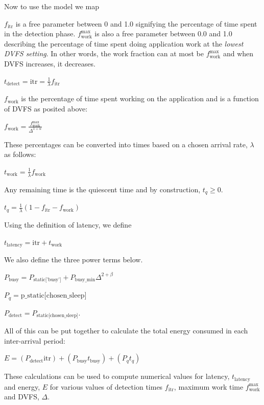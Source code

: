Now to use the model we map


$f_{\text{itr}}$ is a free parameter between 0 and 1.0 signifying the percentage of time spent in the detection phase. $f_{\text{work}}^{\text{max}}$ is also a free parameter between 0.0 and 1.0 describing the percentage of time spent doing application work at the \textit{lowest DVFS setting}. In other words, the work fraction can at most be $f_{\text{work}}^{\text{max}}$ and when DVFS increases, it decreases.

$t_{\text{detect}} = \text{itr} = \frac{1}{\lambda} f_{\text{itr}}$

$f_{\text{work}}$ is the percentage of time spent working on the application and is a function of DVFS as posited above:

$f_{\text{work}} = \frac{f_{\text{work}}^{\text{max}}}{\Delta^{1+\alpha}}$

These percentages can be converted into times based on a chosen arrival rate, $\lambda$ as follows:

$t_{\text{work}} = \frac{1}{\lambda} f_{\text{work}}$

Any remaining time is the quiescent time and by construction, $t_q \geq 0$.

$t_q = \frac{1}{\lambda} (1 - f_{\text{itr}} - f_{\text{work}})$

Using the definition of latency, we define

$\boxed{t_{\text{latency}} = \text{itr} + t_{\text{work}}}$

We also define the three power terms below.

$P_{\text{busy}} = P_{\text{static['busy']}} + P_{\text{busy_min}} \Delta^{2+\beta}$

$P_q = \text{p_static[chosen_sleep]}$

$P_{\text{detect}} = P_{\text{static[chosen_sleep]}}$.

All of this can be put together to calculate the total energy consumed in each inter-arrival period:

$E = (P_{\text{detect}} \text{itr}) + (P_{\text{busy}} t_{\text{busy}}) + (P_q t_q)$

These calculations can be used to compute numerical values for latency, $t_{\text{latency}}$ and energy, $E$ for various values of detection times $f_{\text{itr}}$, maximum work time $f_{\text{work}}^{\text{max}}$ and DVFS, $\Delta$.

